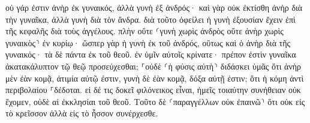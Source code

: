 \documentclass{openreader}
\begin{document}
οὐ γάρ ἐστιν ἀνὴρ ἐκ γυναικός, ἀλλὰ γυνὴ ἐξ ἀνδρός· 
καὶ γὰρ οὐκ ἐκτίσθη ἀνὴρ διὰ τὴν γυναῖκα, ἀλλὰ γυνὴ διὰ τὸν ἄνδρα. 
διὰ τοῦτο ὀφείλει ἡ γυνὴ ἐξουσίαν ἔχειν ἐπὶ τῆς κεφαλῆς διὰ τοὺς ἀγγέλους. 
πλὴν οὔτε ⸂γυνὴ χωρὶς ἀνδρὸς οὔτε ἀνὴρ χωρὶς γυναικὸς⸃ ἐν κυρίῳ· 
ὥσπερ γὰρ ἡ γυνὴ ἐκ τοῦ ἀνδρός, οὕτως καὶ ὁ ἀνὴρ διὰ τῆς γυναικός· τὰ δὲ πάντα ἐκ τοῦ θεοῦ. 
ἐν ὑμῖν αὐτοῖς κρίνατε· πρέπον ἐστὶν γυναῖκα ἀκατακάλυπτον τῷ θεῷ προσεύχεσθαι; 
⸀οὐδὲ ⸂ἡ φύσις αὐτὴ⸃ διδάσκει ὑμᾶς ὅτι ἀνὴρ μὲν ἐὰν κομᾷ, ἀτιμία αὐτῷ ἐστιν, 
γυνὴ δὲ ἐὰν κομᾷ, δόξα αὐτῇ ἐστιν; ὅτι ἡ κόμη ἀντὶ περιβολαίου ⸀δέδοται. 
εἰ δέ τις δοκεῖ φιλόνεικος εἶναι, ἡμεῖς τοιαύτην συνήθειαν οὐκ ἔχομεν, οὐδὲ αἱ ἐκκλησίαι τοῦ θεοῦ. 
Τοῦτο δὲ ⸂παραγγέλλων οὐκ ἐπαινῶ⸃ ὅτι οὐκ εἰς τὸ κρεῖσσον ἀλλὰ εἰς τὸ ἧσσον συνέρχεσθε. 
\end{document}
